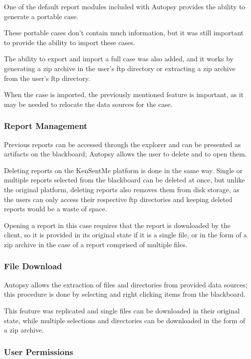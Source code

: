 One of the default report modules included with Autopsy provides the ability to generate a portable case.

These portable cases don't contain much information, but it was still important to provide the ability to import these cases.

The ability to export and import a full case was also added, and it works by generating a zip archive in the user's \acrshort{ftp} directory or extracting a zip archive from the user's \acrshort{ftp} directory.

When the case is imported, the previously mentioned feature is important, as it may be needed to relocate the data sources for the case.

\subsubsection*{Report Management}

Previous reports can be accessed through the explorer and can be presented as artifacts on the blackboard; Autopsy allows the user to delete and to open them.

Deleting reports on the KenSentMe platform is done in the same way. Single or multiple reports selected from the blackboard can be deleted at once, but unlike the original platform, deleting reports also removes them from disk storage, 
as the users can only access their respective \acrshort{ftp} directories and keeping deleted reports would be a waste of space.

Opening a report in this case requires that the report is downloaded by the client, so it is provided in its original state if it is a single file, or in the form of a zip archive in the case of a report comprised of multiple files.

\subsubsection*{File Download}

Autopsy allows the extraction of files and directories from provided data sources; this procedure is done by selecting and right clicking items from the blackboard.

This feature was replicated and single files can be downloaded in their original state, while multiple selections and directories can be downloaded in the form of a zip archive.

\subsubsection*{User Permissions}

